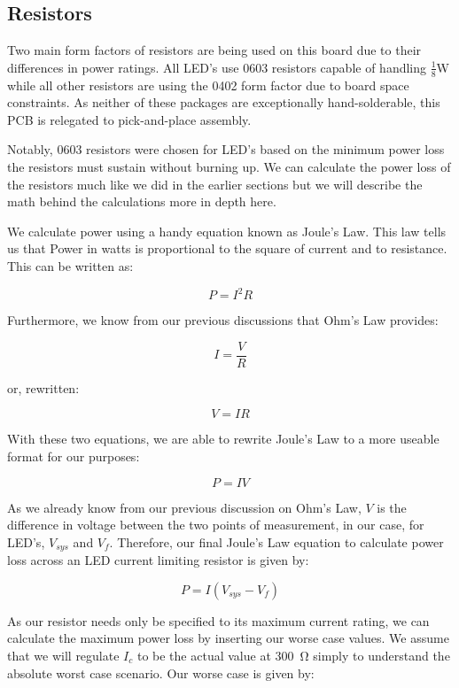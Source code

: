 \documentclass[11pt]{article}
\begin{document}
\subsection{Resistors}

Two main form factors of resistors are being used on this board due to their differences in power ratings. All LED's use 0603 resistors capable of handling \(\frac{1}{8}\)W while all other resistors are using the 0402 form factor due to board space constraints. As neither of these packages are exceptionally hand-solderable, this PCB is relegated to pick-and-place assembly. 

Notably, 0603 resistors were chosen for LED's based on the minimum power loss the resistors must sustain without burning up. We can calculate the power loss of the resistors much like we did in the earlier sections\footnotemark {} but we will describe the math behind the calculations more in depth here. 

We calculate power using a handy equation known as Joule's Law. This law tells us that Power in watts is proportional to the square of current and to resistance. This can be written as:

$$ P = I^2 R $$

Furthermore, we know from our previous discussions that Ohm's Law provides:

$$ I = \frac{V}{R} $$

or, rewritten:

$$ V = I R $$

With these two equations, we are able to rewrite Joule's Law to a more useable format for our purposes:

$$ P = I V $$

As we already know from our previous discussion on Ohm's Law, \(V\) is the difference in voltage between the two points of measurement, in our case, for LED's, \(V_{sys}\) and \(V_f\). Therefore, our final Joule's Law equation to calculate power loss across an LED current limiting resistor is given by:

$$ P = I (V_{sys} - V_f) $$

As our resistor needs only be specified to its maximum current rating, we can calculate the maximum power loss by inserting our worse case values. We assume that we will regulate \(I_c\) to be the actual value at \SI{300}{\ohm} \footnotemark {} simply to understand the absolute worst case scenario. Our worse case is given by:
\end{document}
